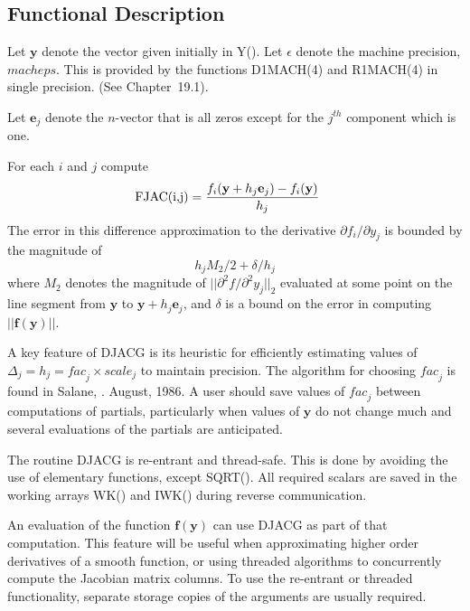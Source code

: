 \documentclass[twoside]{MATH77}
\begin{document}
\subsection{Functional Description}

Let $\mathbf{y}$ denote the vector given initially in Y().  Let $\epsilon $
denote the machine precision, $\mathit{macheps}$. This is provided by the
functions D1MACH(4) and R1MACH(4) in single precision. (See
Chapter~19.1).

Let $\mathbf{e}_j$ denote the $n$-vector that is all zeros except for the
$j^{th}$ component which is one.

For each $i$ and $j$ compute%
\begin{equation*}
\hspace{-12pt}\text{FJAC(i,j)}=
\frac{f_i(\mathbf{y}+h_j \mathbf{e}_j)-f_i(\mathbf{y)}}{h_j}
\end{equation*}
The error in this difference approximation to the derivative $%
\partial f_i/\partial y_j$ is bounded by the magnitude of%
\begin{equation*}
h_jM_2/2+\delta /h_j
\end{equation*}
where $M_2$ denotes the magnitude of $||\partial ^2 f/\partial ^2y_j||_2$
evaluated at some point on the line segment from $\mathbf{y}$ to $%
\mathbf{y}+h_j \mathbf{e}_j$, and $\delta $ is a bound on the error in computing
$||\mathbf{f}(\mathbf{y})||$.

A key feature of DJACG is its heuristic for efficiently estimating values of
$\Delta_j = h_j=\mathit{fac}_j\times \mathit{scale}_j$ to maintain precision.
The algorithm for choosing $\mathit{fac}_j$ is found in Salane,
\cite{Salane:NUMD:1986}.  August, 1986.  A user should save values of
$\mathit{fac}_j$ between computations of partials, particularly when values of
{$\mathbf{y}$} do not change much and several evaluations of the partials are
anticipated.

The routine DJACG is re-entrant and thread-safe.  This is done by
avoiding the use of elementary functions, except SQRT(). All required
scalars are saved in the working arrays WK() and IWK() during
reverse communication.

An evaluation of the function $\mathbf{f}(\mathbf{y})$ can use DJACG as
part of that computation.  This feature will be useful when approximating
higher order derivatives of a smooth function, or using threaded algorithms to
concurrently compute the Jacobian matrix columns.  To use the re-entrant or
threaded functionality, separate storage copies of the arguments are usually
required.
\end{document}
